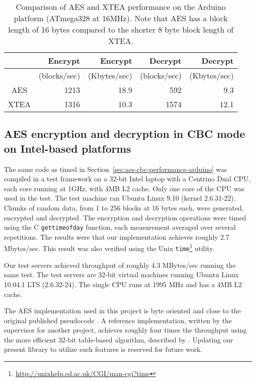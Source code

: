 \begin{table}[h]
\begin{center}
\begin{tabular}{|c|r|r|r|r|}
\hline  & Encrypt & Encrypt & Decrypt & Decrypt \\
\hline  & (blocks/sec) & (Kbytes/sec) & (blocks/sec) & (Kbytes/sec) \\ 
\hline AES & 1213 & 18.9 & 592 & 9.3 \\ 
\hline XTEA & 1316 & 10.3 & 1574 & 12.1 \\ 
\hline 
\end{tabular}
\end{center}
\caption{Comparison of AES and XTEA performance on the Arduino platform (ATmega328 at 16MHz). Note that AES has a block length of 16 bytes compared to the shorter 8 byte block length of XTEA.}
\label{tab:aes-xtea-comparison}
\end{table} 

\subsection{AES encryption and decryption in CBC mode on Intel-based platforms}

The same code as timed in Section~\ref{sec:aes-cbc-performance-arduino} was compiled in a test framework on a 32-bit Intel laptop with a Centrino Dual CPU, each core running at 1GHz, with 4MB L2 cache. Only one core of the CPU was used in the test. The test machine ran Ubuntu Linux 9.10 (kernel 2.6.31-22). Chunks of random data, from 1 to 256 blocks at 16 bytes each, were generated, encrypted and decrypted. The encryption and decryption operations were timed using the C \texttt{gettimeofday} function, each measurement averaged over several repetitions. The results were that our implementation achieves roughly 2.7 Mbytes/sec. This result was also verified using the Unix \texttt{time}\footnote{\url{http://unixhelp.ed.ac.uk/CGI/man-cgi?time}} utility.

Our test servers achieved throughput of roughly 4.3 MBytes/sec running the same test. The test servers are 32-bit virtual machines running Ubuntu Linux 10.04.1 LTS (2.6.32-24). The single CPU runs at 1995 MHz and has a 4MB L2 cache.

The AES implementation used in this project is byte oriented and close to the original published pseudocode . A reference implementation, written by the supervisor for another project, achieves roughly four times the throughput using the more efficient 32-bit table-based algorithm, described by . Updating our present library to utilize such features is reserved for future work.

